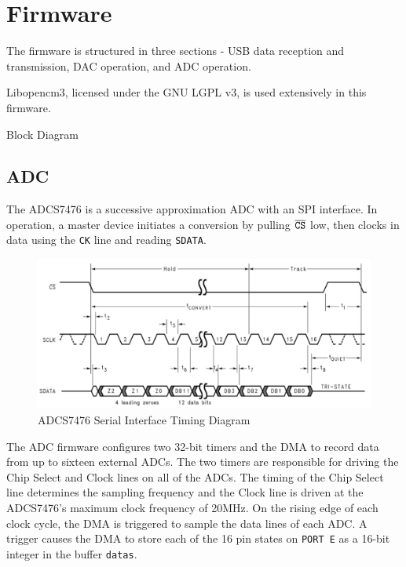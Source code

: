 \documentclass[11pt,twoside]{mitthesis}
\begin{document}
\fi

\chapter{Firmware}

The firmware is structured in three sections - USB data reception and transmission, DAC operation, and ADC operation.

Libopencm3, licensed under the GNU LGPL v3, is used extensively in this firmware.

Block Diagram

\section{ADC}
The ADCS7476 is a successive approximation ADC with an SPI interface.  
In operation, a master device initiates a conversion by pulling $\overline{\mbox{\texttt{CS}}}$ low, then clocks in data using the \texttt{CK} line and reading \texttt{SDATA}.

\begin{figure}[H]
	\label{fig:adc-timing}
  \begin{center}
      \includegraphics[width=\textwidth]{../adc-timing.png}
      \caption{ADCS7476 Serial Interface Timing Diagram}
  \end{center}
\end{figure}

The ADC firmware configures two 32-bit timers and the DMA to record data from up to sixteen external ADCs.
The two timers are responsible for driving the Chip Select and Clock lines on all of the ADCs.
The timing of the Chip Select line determines the sampling frequency and the Clock line is driven at the ADCS7476's maximum clock frequency of 20MHz.
On the rising edge of each clock cycle, the DMA is triggered to sample the data lines of each ADC.
A trigger causes the DMA to store each of the 16 pin states on \texttt{PORT E} as a 16-bit integer in the buffer \texttt{datas}.
\end{document}
